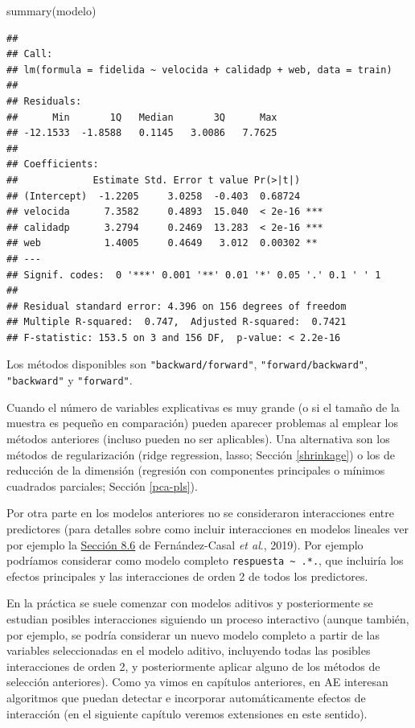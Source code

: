 \documentclass[
]{book}
\newenvironment{Shaded}{\begin{snugshade}}{\end{snugshade}}
\newcommand{\FunctionTok}[1]{\textcolor[rgb]{0.00,0.00,0.00}{#1}}
\newcommand{\NormalTok}[1]{#1}
\theoremstyle{break}
\theoremstyle{definition}
\theoremstyle{definition}
\theoremstyle{definition}
\theoremstyle{definition}
\theoremstyle{remark}
\begin{document}
\begin{Shaded}
\begin{Highlighting}[]
\FunctionTok{summary}\NormalTok{(modelo)}
\end{Highlighting}
\end{Shaded}

\begin{verbatim}
## 
## Call:
## lm(formula = fidelida ~ velocida + calidadp + web, data = train)
## 
## Residuals:
##      Min       1Q   Median       3Q      Max 
## -12.1533  -1.8588   0.1145   3.0086   7.7625 
## 
## Coefficients:
##             Estimate Std. Error t value Pr(>|t|)    
## (Intercept)  -1.2205     3.0258  -0.403  0.68724    
## velocida      7.3582     0.4893  15.040  < 2e-16 ***
## calidadp      3.2794     0.2469  13.283  < 2e-16 ***
## web           1.4005     0.4649   3.012  0.00302 ** 
## ---
## Signif. codes:  0 '***' 0.001 '**' 0.01 '*' 0.05 '.' 0.1 ' ' 1
## 
## Residual standard error: 4.396 on 156 degrees of freedom
## Multiple R-squared:  0.747,  Adjusted R-squared:  0.7421 
## F-statistic: 153.5 on 3 and 156 DF,  p-value: < 2.2e-16
\end{verbatim}

Los métodos disponibles son \texttt{"backward/forward"}, \texttt{"forward/backward"}, \texttt{"backward"} y \texttt{"forward"}.

Cuando el número de variables explicativas es muy grande (o si el tamaño de la muestra es pequeño en comparación) pueden aparecer problemas al emplear los métodos anteriores (incluso pueden no ser aplicables).
Una alternativa son los métodos de regularización (ridge regression, lasso; Sección \ref{shrinkage}) o los de reducción de la dimensión (regresión con componentes principales o mínimos cuadrados parciales; Sección \ref{pca-pls}).

Por otra parte en los modelos anteriores no se consideraron interacciones entre predictores (para detalles sobre como incluir interacciones en modelos lineales ver por ejemplo la \href{https://rubenfcasal.github.io/intror/modelos-lineales.html\#interacciones}{Sección 8.6} de Fernández-Casal \emph{et al}., 2019).
Por ejemplo podríamos considerar como modelo completo \texttt{respuesta\ \textasciitilde{}\ .*.}, que incluiría los efectos principales y las interacciones de orden 2 de todos los predictores.

En la práctica se suele comenzar con modelos aditivos y posteriormente se estudian posibles interacciones siguiendo un proceso interactivo (aunque también, por ejemplo, se podría considerar un nuevo modelo completo a partir de las variables seleccionadas en el modelo aditivo, incluyendo todas las posibles interacciones de orden 2, y posteriormente aplicar alguno de los métodos de selección anteriores).
Como ya vimos en capítulos anteriores, en AE interesan algoritmos que puedan detectar e incorporar automáticamente efectos de interacción (en el siguiente capítulo veremos extensiones en este sentido).
\end{document}
